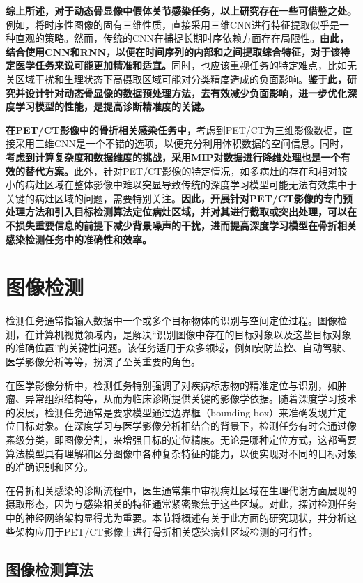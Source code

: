 \textbf{综上所述，对于动态骨显像中假体关节感染任务，以上研究存在一些可借鉴之处。}例如，将时序性图像的固有三维性质，直接采用三维CNN进行特征提取似乎是一种直观的策略。然而，传统的CNN在捕捉长期时序依赖方面存在局限性。\textbf{由此，结合使用CNN和RNN，以便在时间序列的内部和之间提取综合特征，对于该特定医学任务来说可能更加精准和适宜。}同时，也应该重视任务的特定难点，比如无关区域干扰和生理状态下高摄取区域可能对分类精度造成的负面影响。\textbf{鉴于此，研究并设计针对动态骨显像的数据预处理方法，去有效减少负面影响，进一步优化深度学习模型的性能，是提高诊断精准度的关键。}

\textbf{在PET/CT影像中的骨折相关感染任务中，}考虑到PET/CT为三维影像数据，直接采用三维CNN是一个不错的选项，以便充分利用体积数据的空间信息。同时，\textbf{考虑到计算复杂度和数据维度的挑战，采用MIP对数据进行降维处理也是一个有效的替代方案。}此外，针对PET/CT影像的特定情况，如多病灶的存在和相对较小的病灶区域在整体影像中难以突显导致传统的深度学习模型可能无法有效集中于关键的病灶区域的问题，需要特别关注。\textbf{因此，开展针对PET/CT影像的专门预处理方法和引入目标检测算法定位病灶区域，并对其进行截取或突出处理，可以在不损失重要信息的前提下减少背景噪声的干扰，进而提高深度学习模型在骨折相关感染检测任务中的准确性和效率。}

\section{图像检测}

检测任务通常指输入数据中一个或多个目标物体的识别与空间定位过程。图像检测，在计算机视觉领域内，是解决“识别图像中存在的目标对象以及这些目标对象的准确位置”的关键性问题。该任务适用于众多领域，例如安防监控、自动驾驶、医学影像分析等等，扮演了至关重要的角色。

在医学影像分析中，检测任务特别强调了对疾病标志物的精准定位与识别，如肿瘤、异常组织结构等，从而为临床诊断提供关键的影像学依据。随着深度学习技术的发展，检测任务通常是要求模型通过边界框（bounding box）来准确发现并定位目标对象。在深度学习与医学影像分析相结合的背景下，检测任务有时会通过像素级分类，即图像分割，来增强目标的定位精度。无论是哪种定位方式，这都需要算法模型具有理解和区分图像中各种复杂特征的能力，以便实现对不同的目标对象的准确识别和区分。

在骨折相关感染的诊断流程中，医生通常集中审视病灶区域在生理代谢方面展现的摄取形态，因为与感染相关的特征通常紧密聚焦于这些区域。对此，探讨检测任务中的神经网络架构显得尤为重要。本节将概述有关于此方面的研究现状，并分析这些架构应用于PET/CT影像上进行骨折相关感染病灶区域检测的可行性。

\subsection{图像检测算法}

